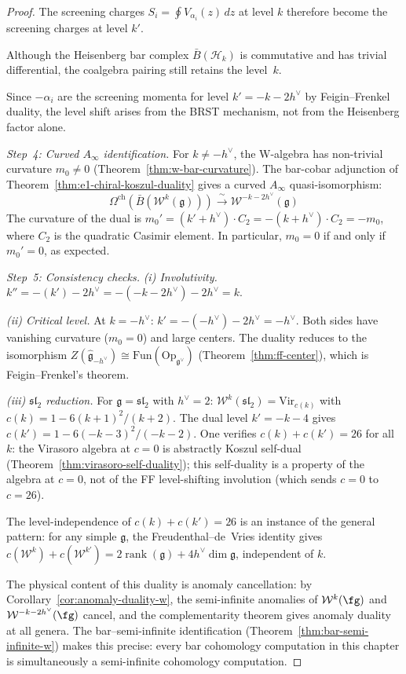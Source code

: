 \begin{proof}
The screening charges $S_i = \oint V_{\alpha_i}(z)\,dz$ at level $k$
therefore become the screening charges at level $k'$.

Although the Heisenberg bar complex $\bar{B}(\mathcal{H}_k)$ is
commutative and has trivial differential, the coalgebra pairing still
retains the level~$k$.

Since $-\alpha_i$ are the screening momenta for level
$k' = -k-2h^\vee$ by Feigin--Frenkel duality, the level shift arises
from the BRST mechanism, not from the Heisenberg factor alone.

\emph{Step~4: Curved $A_\infty$ identification.}
For $k \neq -h^\vee$, the W-algebra has non-trivial curvature $m_0 \neq 0$ (Theorem~\ref{thm:w-bar-curvature}). The bar-cobar adjunction of Theorem~\ref{thm:e1-chiral-koszul-duality} gives a curved $A_\infty$ quasi-isomorphism:
\[
\Omega^{\mathrm{ch}}(\bar{B}(\mathcal{W}^k(\mathfrak{g}))) \xrightarrow{\;\sim\;} \mathcal{W}^{-k-2h^\vee}(\mathfrak{g})
\]
The curvature of the dual is $m_0' = (k' + h^\vee) \cdot C_2 = -(k + h^\vee) \cdot C_2 = -m_0$, where $C_2$ is the quadratic Casimir element.  In particular, $m_0 = 0$ if and only if $m_0' = 0$, as expected.

\emph{Step~5: Consistency checks.}
\emph{(i) Involutivity.}  $k'' = -(k') - 2h^\vee = -(-k-2h^\vee) - 2h^\vee = k$. \checkmark

\emph{(ii) Critical level.}  At $k = -h^\vee$: $k' = -(-h^\vee) - 2h^\vee = -h^\vee$. Both sides have vanishing curvature ($m_0 = 0$) and large centers.  The duality reduces to the isomorphism $Z(\widehat{\mathfrak{g}}_{-h^\vee}) \cong \mathrm{Fun}(\mathrm{Op}_{\mathfrak{g}^\vee})$ (Theorem~\ref{thm:ff-center}), which is Feigin--Frenkel's theorem. \checkmark

\emph{(iii) $\mathfrak{sl}_2$ reduction.}  For $\mathfrak{g} = \mathfrak{sl}_2$ with $h^\vee = 2$: $\mathcal{W}^k(\mathfrak{sl}_2) = \mathrm{Vir}_{c(k)}$ with $c(k) = 1 - 6(k+1)^2/(k+2)$.  The dual level $k' = -k-4$ gives $c(k') = 1 - 6(-k-3)^2/(-k-2)$.  One verifies $c(k) + c(k') = 26$ for all $k$: the Virasoro algebra at $c = 0$ is abstractly Koszul self-dual (Theorem~\ref{thm:virasoro-self-duality}); this self-duality is a property of the algebra at $c=0$, not of the FF level-shifting involution (which sends $c=0$ to $c=26$). \checkmark

The level-independence of $c(k) + c(k') = 26$ is an instance of the
general pattern: for any simple $\mathfrak{g}$, the Freudenthal--de~Vries
identity gives $c(\mathcal{W}^k) + c(\mathcal{W}^{k'})
= 2\operatorname{rank}(\mathfrak{g}) + 4h^\vee\dim\mathfrak{g}$,
independent of $k$.

The physical content of this duality is anomaly cancellation:
by Corollary~\ref{cor:anomaly-duality-w}, the semi-infinite
anomalies of $\mathcal{W}^k(\fg)$ and $\mathcal{W}^{-k-2h^\vee}(\fg)$
cancel, and the complementarity theorem gives anomaly duality at
all genera.  The bar--semi-infinite identification
(Theorem~\ref{thm:bar-semi-infinite-w}) makes this precise: every
bar cohomology computation in this chapter is simultaneously a
semi-infinite cohomology computation.
\end{proof}


